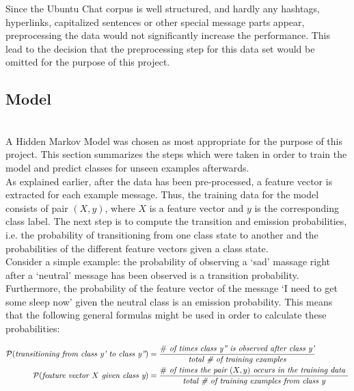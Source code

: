 \documentclass{article} %
\newcommand{\red}[1]{\textit{\color{red}{#1}}}
\begin{document}
Since the Ubuntu Chat corpus is well structured, and hardly any hashtags, hyperlinks, capitalized sentences or other special message parts appear, preprocessing the data would not significantly increase the performance. This lead to the decision that the preprocessing step for this data set would be omitted for the purpose of this project.



\subsection{Model}

\red{To be modified and corrected} \\

A Hidden Markov Model was chosen as most appropriate for the purpose of this project. This section summarizes the steps which were taken in order to train the model and predict classes for unseen examples afterwards. \\

\noindent As explained earlier, after the data has been pre-processed, a feature vector is extracted for each example message. Thus, the training data for the model consists of pair $(X, y)$, where $X$ is a feature vector and $y$ is the corresponding class label. The next step is to compute the transition and emission probabilities, i.e. the probability of transitioning from one class state to another and the probabilities of the different feature vectors given a class state. \\

\noindent  Consider a simple example: the probability of observing a `sad' massage right after a `neutral' message has been observed is a transition probability. Furthermore, the probability of the feature vector of the message `I need to get some sleep now' given the neutral class is an emission probability. This means that the following general formulas might be used in order to calculate these probabilities:

\begin{align*}
\cal{P} (\textit{transitioning from class y' to class y''}) 
&= \frac {\# \textit{ of times class y'' is observed after class y'}} {\textit {total \# of training examples}} \\
\cal{P} (\textit{feature vector $X$ given class y}) 
&= \frac {\# \textit{ of times the pair $(X, y)$ occurs in the training data }} {\textit {total \# of training examples from class y}} \\
\end{align*}
\end{document}
